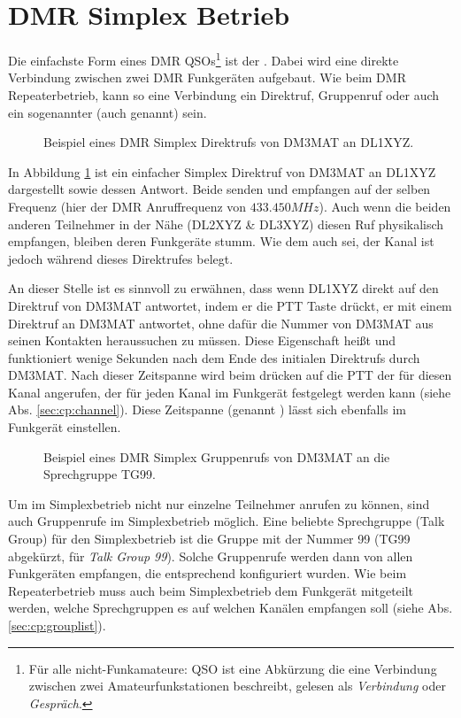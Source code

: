 \section{DMR Simplex Betrieb} \label{sec:simplex}
Die einfachste Form eines DMR QSOs\footnote{Für alle nicht-Funkamateure: QSO ist eine Abkürzung die eine Verbindung zwischen zwei Amateurfunkstationen beschreibt, gelesen als \emph{Verbindung} oder \emph{Gespräch}.} ist der . Dabei wird eine direkte Verbindung zwischen zwei DMR Funkgeräten aufgebaut. Wie beim DMR Repeaterbetrieb, kann so eine Verbindung ein Direktruf, Gruppenruf oder auch ein sogenannter  (auch  genannt) sein. 

\begin{figure}[!ht]
 \centering
 
 \caption{Beispiel eines DMR Simplex Direktrufs von DM3MAT an DL1XYZ.} \label{fig:splxpc}
\end{figure}

In Abbildung \ref{fig:splxpc} ist ein einfacher Simplex Direktruf von DM3MAT an DL1XYZ dargestellt sowie dessen Antwort. Beide senden und empfangen auf der selben Frequenz (hier der DMR Anruffrequenz von $433.450 MHz$). Auch wenn die beiden anderen Teilnehmer in der Nähe (DL2XYZ \& DL3XYZ) diesen Ruf physikalisch empfangen, bleiben deren Funkgeräte stumm. Wie dem auch sei, der Kanal ist jedoch während dieses Direktrufes belegt. 

An dieser Stelle ist es sinnvoll zu erwähnen, dass wenn DL1XYZ direkt auf den Direktruf von DM3MAT antwortet, indem er die PTT Taste drückt, er mit einem Direktruf an DM3MAT antwortet, ohne dafür die Nummer von DM3MAT aus seinen Kontakten heraussuchen zu müssen. Diese Eigenschaft heißt  und funktioniert wenige Sekunden nach dem Ende des initialen Direktrufs durch DM3MAT. Nach dieser Zeitspanne wird beim drücken auf die PTT der  für diesen Kanal angerufen, der für jeden Kanal im Funkgerät festgelegt werden kann (siehe Abs. \ref{sec:cp:channel}). Diese Zeitspanne (genannt ) lässt sich ebenfalls im Funkgerät einstellen.

\begin{figure}[!ht]
  \centering
  
  \caption{Beispiel eines DMR Simplex Gruppenrufs von DM3MAT an die Sprechgruppe TG99.} \label{fig:splxgc}
\end{figure}

Um im Simplexbetrieb nicht nur einzelne Teilnehmer anrufen zu können, sind auch Gruppenrufe im Simplexbetrieb möglich. Eine beliebte Sprechgruppe (Talk Group) für den Simplexbetrieb ist die Gruppe mit der Nummer 99  (TG99 abgekürzt, für \emph{Talk Group 99}). Solche Gruppenrufe werden dann von allen Funkgeräten empfangen, die entsprechend konfiguriert wurden. Wie beim Repeaterbetrieb muss auch beim Simplexbetrieb dem Funkgerät mitgeteilt werden, welche Sprechgruppen es auf welchen Kanälen empfangen soll (siehe Abs. \ref{sec:cp:grouplist}). 

